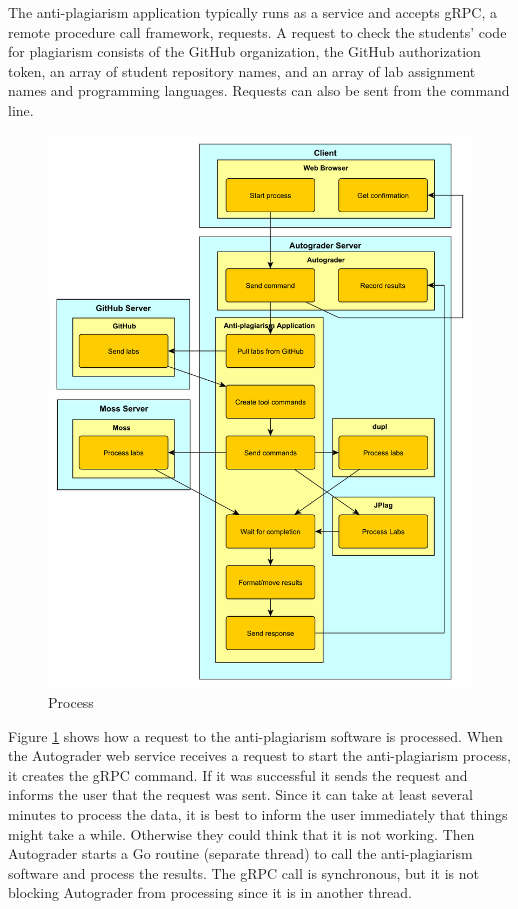 \documentclass[10pt,journal,compsoc]{IEEEtran}
\begin{document}
		The anti-plagiarism application typically runs as a service and accepts gRPC, a remote procedure call framework, requests. A request to check the students' code for plagiarism consists of the GitHub organization, the GitHub authorization token, an array of student repository names, and an array of lab assignment names and programming languages. Requests can also be sent from the command line.
		
		\begin{figure}[h!]
			\includegraphics[width=1.0\textwidth]{process2.pdf}
			\caption{Process}
			\label{fig:process}
		\end{figure}
		
		Figure \ref{fig:process} shows how a request to the anti-plagiarism software is processed. When the Autograder web service receives a request to start the anti-plagiarism process, it creates the gRPC command. If it was successful it sends the request and informs the user that the request was sent. Since it can take at least several minutes to process the data, it is best to inform the user immediately that things might take a while. Otherwise they could think that it is not working. Then Autograder starts a Go routine (separate thread) to call the anti-plagiarism software and process the results. The gRPC call is synchronous, but it is not blocking Autograder from processing since it is in another thread.
	
\end{document}
